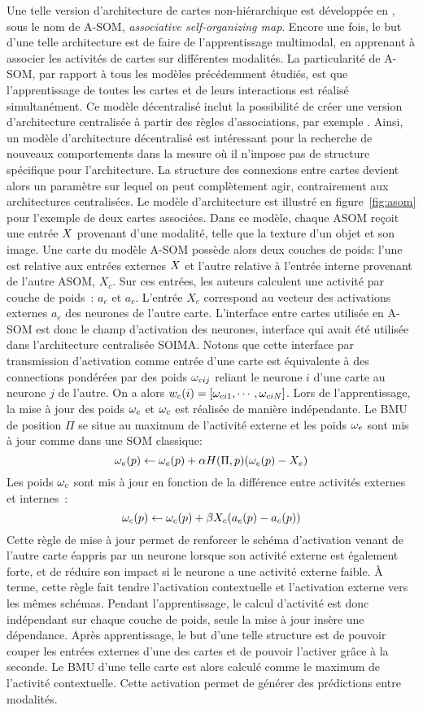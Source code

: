 \documentclass[../main]{subfiles}
\begin{document}
Une telle version d'architecture de cartes non-hiérarchique est développée en \cite{johnsson_associating_2008,johnsson_associative_2009}, sous le nom de A-SOM, \emph{associative self-organizing map}. Encore une fois, le but d'une telle architecture est de faire de l'apprentissage multimodal, en apprenant à associer les activités de cartes sur différentes modalités. La particularité de A-SOM, par rapport à tous les modèles précédemment étudiés, est que l'apprentissage de toutes les cartes et de leurs interactions est réalisé simultanément. Ce modèle décentralisé inclut la possibilité de créer une version d'architecture centralisée à partir des règles d'associations, par exemple \cite{buonamente_hierarchies_2016}. Ainsi, un modèle d'architecture décentralisé est intéressant pour la recherche de nouveaux comportements dans la mesure où il n'impose pas de structure spécifique pour l'architecture. La structure des connexions entre cartes devient alors un paramètre sur lequel on peut complètement agir, contrairement aux architectures centralisées. Le modèle d'architecture est illustré en figure~\ref{fig:asom} pour l'exemple de deux cartes associées. 
Dans ce modèle, chaque ASOM reçoit une entrée $X$ provenant d'une modalité, telle que la texture d'un objet et son image. 
Une carte du modèle A-SOM possède alors deux couches de poids: l'une est relative aux entrées externes $X$ et l'autre relative à l'entrée interne provenant de l'autre ASOM, $X_c$.
Sur ces entrées, les auteurs calculent une activité par couche de poids~: $a_e$ et $a_c$.
L'entrée $X_c$ correspond au vecteur des activations externes $a_e$ des neurones de l'autre carte.
L'interface entre cartes utilisée en A-SOM est donc le champ d'activation des neurones, interface qui avait été utilisée dans l'architecture centralisée SOIMA. Notons que cette interface par transmission d'activation comme entrée d'une carte est équivalente à des connections pondérées par des poids $\omega_{cij}$ reliant le neurone $i$ d'une carte au neurone $j$ de l'autre. On a alors $w_c(i) = [\omega_{ci1}, \cdots, \omega_{ciN}]$.
Lors de l'apprentissage, la mise à jour des poids $\omega_e$ et $\omega_c$ est réalisée de manière indépendante. 
Le BMU de position $\Pi$ se situe au maximum de l'activité externe et les poids $\omega_e$ sont mis à jour comme dans une SOM classique:
$$ \omega_e(p) \leftarrow \omega_e(p) + \alpha H(\Pi,p)(\omega_e(p) - X_e )$$
Les poids $\omega_c$ sont mis à jour en fonction de la différence entre activités externes et internes~:
$$ \omega_c(p) \leftarrow \omega_c(p) + \beta X_c (a_e(p) - a_c(p))$$
Cette règle de mise à jour permet de renforcer le schéma d'activation venant de l'autre carte éappris par un neurone lorsque son activité externe est également forte, et de réduire son impact si le neurone a une activité externe faible. \`A terme, cette règle fait tendre l'activation contextuelle et l'activation externe vers les mêmes schémas.
Pendant l'apprentissage, le calcul d'activité est donc indépendant sur chaque couche de poids, seule la mise à jour insère une dépendance.
Après apprentissage, le but d'une telle structure est de pouvoir couper les entrées externes d'une des cartes et de pouvoir l'activer grâce à la seconde. Le BMU d'une telle carte est alors calculé comme le maximum de l'activité contextuelle. Cette activation permet de générer des prédictions entre modalités.
\end{document}
